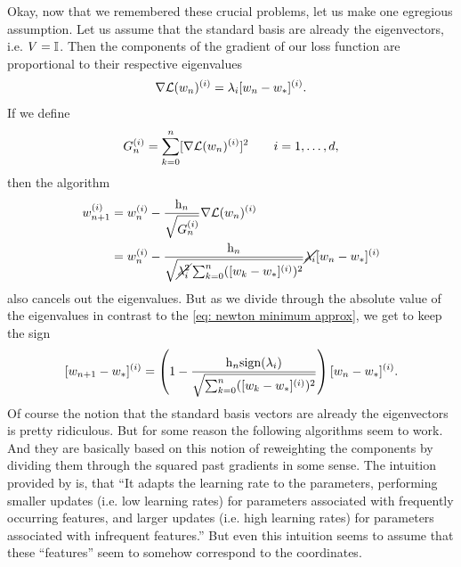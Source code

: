 Okay, now that we remembered these crucial problems, let us make one egregious
assumption. Let us assume that the standard basis are already the eigenvectors,
i.e. \(V=\mathbb{I}\). Then the components of the gradient of our loss function
are proportional to their respective eigenvalues
\begin{align*}
	\nabla\mathcal{L}(w_n)^{(i)}
	= \lambda_i [w_n - w_*]^{(i)}.
\end{align*}
If we define
\begin{align*}
	G_n^{(i)} = \sum_{k=0}^n [\nabla\mathcal{L}(w_n)^{(i)}]^2 \qquad i=1,\dots,d,
\end{align*}
then the algorithm
\begin{align}
	\label{eq: almost adagrad}
	w_{n+1}^{(i)}
	&= w_n^{(i)} - \frac{\text{h}_n}{\sqrt{G_n^{(i)}}}\nabla\mathcal{L}(w_n)^{(i)}\\
	\nonumber
	&= w_n^{(i)} - \frac{\text{h}_n}{
		\sqrt{\cancel{\lambda_i^2}\sum_{k=0}^n([w_k - w_*]^{(i)})^2}
	}
	\cancel{\lambda_i}[w_n - w_*]^{(i)}
\end{align}
also cancels out the eigenvalues. But as we divide through the absolute value of
the eigenvalues in contrast to the \ref{eq: newton minimum approx}, we get to
keep the sign
\begin{align}\label{eq: adagrad motivation contraction}
	[w_{n+1}-w_*]^{(i)} = \left(1-\frac{\text{h}_n\text{sign}(\lambda_i)}{
			\sqrt{\sum_{k=0}^n([w_k - w_*]^{(i)})^2}
		}\right)[w_n - w_*]^{(i)}.
\end{align}
Of course the notion that the standard basis vectors are already the eigenvectors
is pretty ridiculous. But for some reason the following algorithms seem to
work. And they are basically based on this notion of reweighting the components
by dividing them through the squared past gradients in some sense. The intuition
provided by \textcite{ruderOverviewGradientDescent2017} is, that
``It adapts the learning rate to the parameters, performing smaller updates
(i.e. low learning rates) for parameters associated with frequently occurring
features, and larger updates (i.e. high learning rates) for parameters
associated with infrequent features.'' But even this intuition seems to assume
that these ``features'' seem to somehow correspond to the coordinates.


